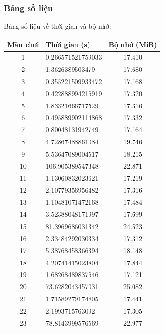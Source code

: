 \documentclass[a4paper, 11pt]{article}
\begin{document}
\subsubsection{Bảng số liệu}
Bảng số liệu về thời gian và bộ nhớ:
\begin{center}
	\begin{tabular}{|c|l|c|}
		\hline
		Màn chơi & Thời gian (s)     & Bộ nhớ (MiB) \\ \hline
		1        & 0.266571521759033 & 17.410       \\ \hline
		2        & 1.3626389503479   & 17.680       \\ \hline
		3        & 0.355221509933472 & 17.168       \\ \hline
		4        & 0.422888994216919 & 17.320       \\ \hline
		5        & 1.83321666717529  & 17.316       \\ \hline
		6        & 0.495889902114868 & 17.332       \\ \hline
		7        & 0.80048131942749  & 17.164       \\ \hline
		8        & 4.72867488861084  & 19.746       \\ \hline
		9        & 5.53647089004517  & 18.215       \\ \hline
		10       & 106.905389547348  & 22.871       \\ \hline
		11       & 1.13060832023621  & 17.219       \\ \hline
		12       & 2.10779356956482  & 17.316       \\ \hline
		13       & 1.10481071472168  & 17.484       \\ \hline
		14       & 3.52388048171997  & 17.699       \\ \hline
		15       & 81.3969686031342  & 24.523       \\ \hline
		16       & 2.33484292030334  & 17.312       \\ \hline
		17       & 5.38768458366394  & 18.148       \\ \hline
		18       & 4.20741415023804  & 17.844       \\ \hline
		19       & 1.68268489837646  & 17.121       \\ \hline
		20       & 73.6282043457031  & 25.082       \\ \hline
		21       & 1.71589279174805  & 17.441       \\ \hline
		22       & 2.1993715763092   & 17.305       \\ \hline
		23       & 78.8143999576569  & 22.977       \\ \hline

\end{tabular}
\end{center}
\end{document}
